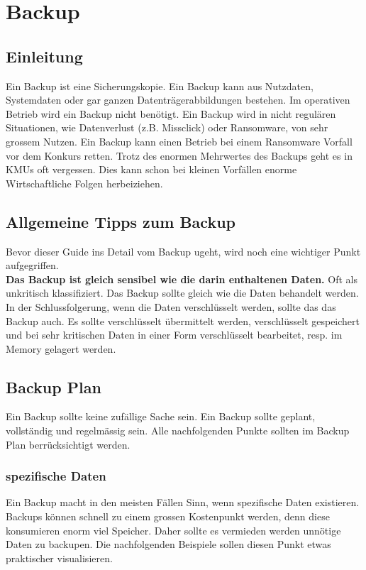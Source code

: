 \chapter{Backup}

\section{Einleitung}
Ein Backup ist eine Sicherungskopie.
Ein Backup kann aus Nutzdaten, Systemdaten oder gar ganzen Datenträgerabbildungen bestehen.
Im operativen Betrieb wird ein Backup nicht benötigt.
Ein Backup wird in nicht regulären Situationen, wie Datenverlust (z.B. Missclick) oder Ransomware, von sehr grossem Nutzen.
Ein Backup kann einen Betrieb bei einem Ransomware Vorfall vor dem Konkurs retten.
Trotz des enormen Mehrwertes des Backups geht es in KMUs oft vergessen.
Dies kann schon bei kleinen Vorfällen enorme Wirtschaftliche Folgen herbeiziehen.



\section{Allgemeine Tipps zum Backup}
Bevor dieser Guide ins Detail vom Backup ugeht, wird noch eine wichtiger Punkt aufgegriffen.\\

\textbf{Das Backup ist gleich sensibel wie die darin enthaltenen Daten.}
Oft als unkritisch klassifiziert.
Das Backup sollte gleich wie die Daten behandelt werden.
In der Schlussfolgerung, wenn die Daten verschlüsselt werden, sollte das das Backup auch.
Es sollte verschlüsselt übermittelt werden, verschlüsselt gespeichert und bei sehr kritischen Daten in einer Form verschlüsselt bearbeitet, resp. im Memory gelagert werden.

\section{Backup Plan}
Ein Backup sollte keine zufällige Sache sein.
Ein Backup sollte geplant, vollständig und regelmässig sein.
Alle nachfolgenden Punkte sollten im Backup Plan berrücksichtigt werden.



\subsection{spezifische Daten}
Ein Backup macht in den meisten Fällen Sinn, wenn spezifische Daten existieren.
Backups können schnell zu einem grossen Kostenpunkt werden, denn diese konsumieren enorm viel Speicher.
Daher sollte es vermieden werden unnötige Daten zu backupen.
Die nachfolgenden Beispiele sollen diesen Punkt etwas praktischer visualisieren.\\


